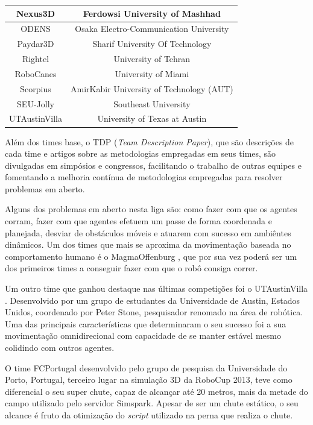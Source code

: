 \begin{table}[!htb]
\begin{tabular}{|c|c|}
    \hline
    Nexus3D & Ferdowsi University of Mashhad \\
    \hline
    ODENS & Osaka Electro-Communication University \\
    \hline
    Paydar3D & Sharif University Of Technology \\
    \hline
    Rightel & University of Tehran \\
    \hline
    RoboCanes & University of Miami \\
    \hline
    Scorpius & AmirKabir University of Technology (AUT) \\
    \hline
    SEU-Jolly & Southeast University \\
    \hline
    UTAustinVilla & University of Texas at Austin \\
    \hline
    \hline
  \end{tabular}

  \label{tab:times}
\end{table}


Além dos times base, o TDP ({\it Team Description Paper}), que são descrições de cada time e artigos sobre as metodologias empregadas
em seus times, são divulgadas em simpósios e congressos, facilitando o trabalho de outras equipes e fomentando a melhoria contínua
de metodologias empregadas para resolver problemas em aberto.

Alguns dos problemas em aberto nesta liga são: como fazer com que os agentes corram, fazer 
com que agentes efetuem um passe de forma coordenada e planejada, desviar de obstáculos móveis e atuarem com sucesso em ambi\^entes dinâmicos. 
Um dos times que mais se aproxima da movimentação baseada no comportamento humano é o MagmaOffenburg \cite{dorer}, 
que por sua vez poderá ser um dos primeiros times a conseguir fazer com que o robô consiga correr.

Um outro time que ganhou destaque nas últimas competições foi o UTAustinVilla \cite{MacAlpine2}. Desenvolvido por um grupo de 
estudantes da Universidade de Austin, Estados Unidos, coordenado por Peter Stone, pesquisador renomado na área de robótica. 
Uma das principais características que determinaram o seu sucesso foi a sua movimentação omnidirecional com capacidade de 
se manter estável mesmo colidindo com outros agentes.

O time FCPortugal  desenvolvido pelo grupo de pesquisa da Universidade do Porto, Portugal, terceiro lugar na simulação 3D da 
RoboCup 2013, teve como diferencial o seu super chute, capaz de alcançar até 20 metros, mais da metade do campo utilizado pelo servidor 
Simspark. Apesar de ser um chute estático, o seu alcance é fruto da otimização do {\it script} utilizado na perna que realiza o chute.

